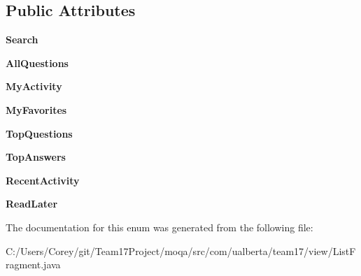 \subsection*{Public Attributes}
\begin{DoxyCompactItemize}
\item 
\hypertarget{enumcom_1_1ualberta_1_1team17_1_1view_1_1_list_fragment_1_1_taxonomy_aa5f7a04ced652e59b76b1c11ca15862e}{{\bfseries Search}}\label{enumcom_1_1ualberta_1_1team17_1_1view_1_1_list_fragment_1_1_taxonomy_aa5f7a04ced652e59b76b1c11ca15862e}

\item 
\hypertarget{enumcom_1_1ualberta_1_1team17_1_1view_1_1_list_fragment_1_1_taxonomy_a3da21a1b9eb107a11ba16484a607e74a}{{\bfseries All\+Questions}}\label{enumcom_1_1ualberta_1_1team17_1_1view_1_1_list_fragment_1_1_taxonomy_a3da21a1b9eb107a11ba16484a607e74a}

\item 
\hypertarget{enumcom_1_1ualberta_1_1team17_1_1view_1_1_list_fragment_1_1_taxonomy_a3369623cbdd9d62afb87a36f091618f3}{{\bfseries My\+Activity}}\label{enumcom_1_1ualberta_1_1team17_1_1view_1_1_list_fragment_1_1_taxonomy_a3369623cbdd9d62afb87a36f091618f3}

\item 
\hypertarget{enumcom_1_1ualberta_1_1team17_1_1view_1_1_list_fragment_1_1_taxonomy_a88bb2ccd85b2f89d1ae324374a88b04e}{{\bfseries My\+Favorites}}\label{enumcom_1_1ualberta_1_1team17_1_1view_1_1_list_fragment_1_1_taxonomy_a88bb2ccd85b2f89d1ae324374a88b04e}

\item 
\hypertarget{enumcom_1_1ualberta_1_1team17_1_1view_1_1_list_fragment_1_1_taxonomy_a2b64863e93120f0841d1726753cde33a}{{\bfseries Top\+Questions}}\label{enumcom_1_1ualberta_1_1team17_1_1view_1_1_list_fragment_1_1_taxonomy_a2b64863e93120f0841d1726753cde33a}

\item 
\hypertarget{enumcom_1_1ualberta_1_1team17_1_1view_1_1_list_fragment_1_1_taxonomy_a8bd5626d58b835a7740e8fa549c5722d}{{\bfseries Top\+Answers}}\label{enumcom_1_1ualberta_1_1team17_1_1view_1_1_list_fragment_1_1_taxonomy_a8bd5626d58b835a7740e8fa549c5722d}

\item 
\hypertarget{enumcom_1_1ualberta_1_1team17_1_1view_1_1_list_fragment_1_1_taxonomy_a18ea73c28cad3119fdaa5c07db77add5}{{\bfseries Recent\+Activity}}\label{enumcom_1_1ualberta_1_1team17_1_1view_1_1_list_fragment_1_1_taxonomy_a18ea73c28cad3119fdaa5c07db77add5}

\item 
\hypertarget{enumcom_1_1ualberta_1_1team17_1_1view_1_1_list_fragment_1_1_taxonomy_afa1d4bdea09a35d68c809f174e5542fe}{{\bfseries Read\+Later}}\label{enumcom_1_1ualberta_1_1team17_1_1view_1_1_list_fragment_1_1_taxonomy_afa1d4bdea09a35d68c809f174e5542fe}

\end{DoxyCompactItemize}


The documentation for this enum was generated from the following file\+:\begin{DoxyCompactItemize}
\item 
C\+:/\+Users/\+Corey/git/\+Team17\+Project/moqa/src/com/ualberta/team17/view/List\+Fragment.\+java\end{DoxyCompactItemize}
